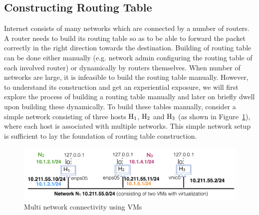 \begin{multicols}{2}
\section{Constructing Routing Table}\label{chap2-sec4}

Internet consists of many networks which are connected by a number of routers. A router needs to build its routing table so as to be able to forward the packet correctly in the right direction towards the destination. Building of routing table can be done either manually (e.g. network admin configuring the routing table of each involved router) or dynamically by routers themselves. When number of networks are large, it is infeasible to build the routing table manually. However, to understand its construction and get an experiential exposure, we will first explore the process of building a routing table manually and later on briefly dwell upon building these dynamically. To build these tables manually, consider a simple network consisting of three hosts ${\rm H}_{1}$, ${\rm H}_{2}$ and ${\rm H}_{3}$ (as shown in Figure~\ref{chap2-fig02}), where each host is associated with multiple networks. This simple network setup is sufficient to lay the foundation of routing table construction.
\end{multicols}

\vspace{-.8cm}

\begin{figure}[H]
\centering
\includegraphics[scale=1.2]{src/Figures/chap2/chap2-fig02.jpg}

\vspace{-.2cm}

\caption{Multi network connectivity using VMs}\label{chap2-fig02}

\vspace{-.2cm}
\end{figure}

